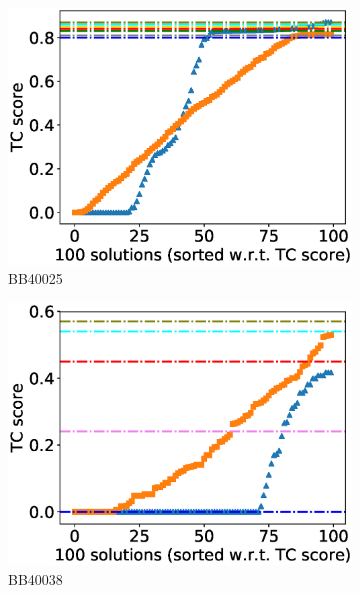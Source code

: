 \begin{figure}[!htbp]
\begin{adjustwidth}{-1cm}{-1cm}
\begin{subfigure}{0.22\textwidth}
			\includegraphics[width=\columnwidth]{Figure/summary/precomputedInit/Balibase/BB40025_tc_density_single_run_2}
			\caption{BB40025}
		\end{subfigure}
		\begin{subfigure}{0.22\textwidth}
			\includegraphics[width=\columnwidth]{Figure/summary/precomputedInit/Balibase/BB40038_tc_density_single_run_2}
			\caption{BB40038}
		\end{subfigure}
		\begin{subfigure}{0.22\textwidth}

\end{subfigure}
\end{adjustwidth}
\end{figure}
